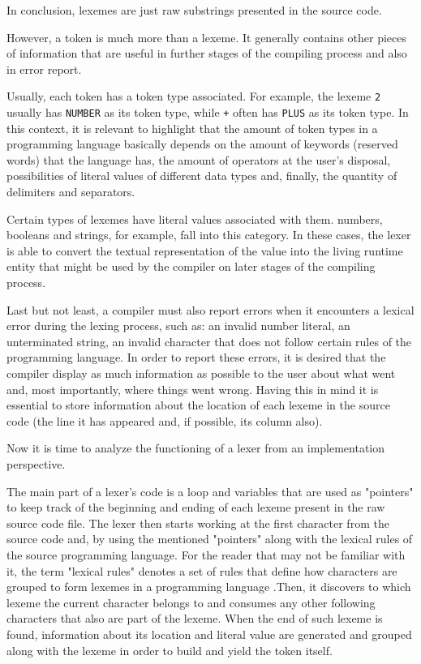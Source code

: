 In conclusion, lexemes are just raw substrings presented in the source code.

However, a token is much more than a lexeme. It generally contains other pieces of information that are useful in further stages of the compiling process and also in error report.

Usually, each token has a token type associated. For example, the lexeme \texttt{2} usually has \texttt{NUMBER} as its token type, while \texttt{+} often has \texttt{PLUS} as its token type. In this context, it is relevant to highlight that the amount of token types in a programming language basically depends on the amount of keywords (reserved words) that the language has, the amount of operators at the user's disposal, possibilities of literal values of different data types and, finally, the quantity of delimiters and separators.

Certain types of lexemes have literal values associated with them. numbers, booleans and strings, for example, fall into this category. In these cases, the lexer is able to convert the textual representation of the value into the living runtime entity that might be used by the compiler on later stages of the compiling process.

Last but not least, a compiler must also report errors when it encounters a lexical error during the lexing process, such as: an invalid number literal, an unterminated string, an invalid character that does not follow certain rules of the programming language. In order to report these errors, it is desired that the compiler display as much information as possible to the user about what went and, most importantly, where things went wrong. Having this in mind it is essential to store information about the location of each lexeme in the source code (the line it has appeared and, if possible, its column also).

Now it is time to analyze the functioning of a lexer from an implementation perspective.

The main part of a lexer's code is a loop and variables that are used as "pointers" to keep track of the beginning and ending of each lexeme present in the raw source code file. The lexer then starts working at the first character from the source code and, by using the mentioned "pointers" along with the lexical rules of the source programming language. For the reader that may not be familiar with it, the term "lexical rules" denotes a set of rules that define how characters are grouped to form lexemes in a programming language .Then, it discovers to which lexeme the current character belongs to and consumes any other following characters that also are part of the lexeme. When the end of such lexeme is found, information about its location and literal value are generated and grouped along with the lexeme in order to build and yield the token itself.

